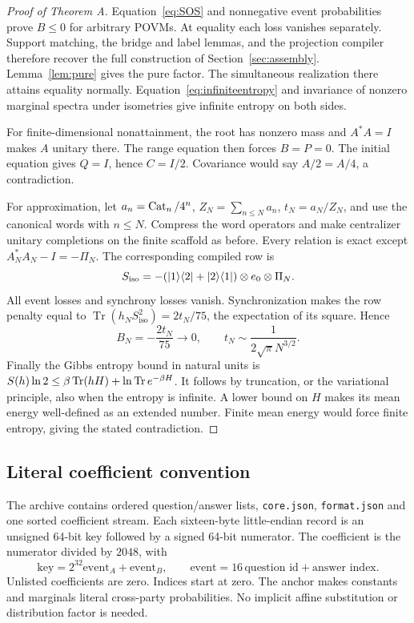 \begin{proof}[Proof of Theorem A]
Equation~\eqref{eq:SOS} and nonnegative event probabilities prove $B\leq0$ for arbitrary POVMs. At equality each loss vanishes separately. Support matching, the bridge and label lemmas, and the projection compiler therefore recover the full construction of Section~\ref{sec:assembly}. Lemma~\ref{lem:pure} gives the pure factor. The simultaneous realization there attains equality normally. Equation~\eqref{eq:infiniteentropy} and invariance of nonzero marginal spectra under isometries give infinite entropy on both sides.

For finite-dimensional nonattainment, the root has nonzero mass and $A^*A=I$ makes $A$ unitary there. The range equation then forces $B=P=0$. The initial equation gives $Q=I$, hence $C=I/2$. Covariance would say $A/2=A/4$, a contradiction.

For approximation, let $a_n=\operatorname{Cat}_n/4^n$, $Z_N=\sum_{n\leq N}a_n$, $t_N=a_N/Z_N$, and use the canonical words with $n\leq N$. Compress the word operators and make centralizer unitary completions on the finite scaffold as before. Every relation is exact except $A_N^*A_N-I=-\Pi_N$. The corresponding compiled row is
\[
 S_{\rm iso}=-(|1\rangle\langle2|+|2\rangle\langle1|)
                \otimes e_0\otimes\Pi_N.
\]
All event losses and synchrony losses vanish. Synchronization makes the row penalty equal to $\operatorname{Tr}(h_N S_{\mathrm{iso}}^2)=2t_N/75$, the expectation of its square. Hence
\begin{equation}\label{eq:cutoffB}
 B_N=-\frac{2t_N}{75}\longrightarrow0,
 \qquad t_N\sim\frac1{2\sqrt\pi N^{3/2}}.
\end{equation}
Finally the Gibbs entropy bound in natural units is
$S(h)\ln2\leq\beta\operatorname{Tr}(hH)+\ln\operatorname{Tr} e^{-\beta H}$. It follows by truncation, or the variational principle, also when the entropy is infinite. A lower bound on $H$ makes its mean energy well-defined as an extended number. Finite mean energy would force finite entropy, giving the stated contradiction.
\end{proof}

\subsection{Literal coefficient convention}
The archive contains ordered question/answer lists, \texttt{core.json}, \texttt{format.json} and one sorted coefficient stream. Each sixteen-byte little-endian record is an unsigned 64-bit key followed by a signed 64-bit numerator. The coefficient is the numerator divided by $2048$, with
\[
 \text{key}=2^{32}\text{event}_A+\text{event}_B,
 \qquad \text{event}=16\,\text{question id}+\text{answer index}.
\]
Unlisted coefficients are zero. Indices start at zero. The anchor makes constants and marginals literal cross-party probabilities. No implicit affine substitution or distribution factor is needed.

